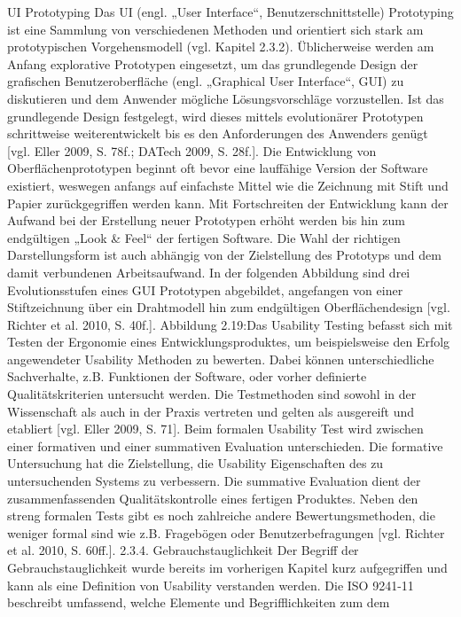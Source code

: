 \documentclass[a4paper, 12pt, twoside, BCOR=20mm, DIV=calc, abstracton, parskip=half*, toc=bibliography, toc=listof, headsepline, footsepline, headings=small, numbers=enddot]{scrreprt}
\begin{document}
UI Prototyping
Das UI (engl. „User Interface“, Benutzerschnittstelle) Prototyping ist eine Sammlung
von verschiedenen Methoden und orientiert sich stark am prototypischen Vorgehensmodell
(vgl. Kapitel 2.3.2). Üblicherweise werden am Anfang explorative Prototypen
eingesetzt, um das grundlegende Design der grafischen Benutzeroberfläche
(engl. „Graphical User Interface“, GUI) zu diskutieren und dem Anwender mögliche
Lösungsvorschläge vorzustellen. Ist das grundlegende Design festgelegt, wird dieses
mittels evolutionärer Prototypen schrittweise weiterentwickelt bis es den Anforderungen
des Anwenders genügt [vgl. Eller 2009, S. 78f.; DATech 2009, S. 28f.]. Die Entwicklung
von Oberflächenprototypen beginnt oft bevor eine lauffähige Version der
Software existiert, weswegen anfangs auf einfachste Mittel wie die Zeichnung mit
Stift und Papier zurückgegriffen werden kann. Mit Fortschreiten der Entwicklung kann
der Aufwand bei der Erstellung neuer Prototypen erhöht werden bis hin zum endgültigen
„Look & Feel“ der fertigen Software. Die Wahl der richtigen Darstellungsform ist
auch abhängig von der Zielstellung des Prototyps und dem damit verbundenen Arbeitsaufwand.
In der folgenden Abbildung sind drei Evolutionsstufen eines GUI Prototypen
abgebildet, angefangen von einer Stiftzeichnung über ein Drahtmodell hin
zum endgültigen Oberflächendesign [vgl. Richter et al. 2010, S. 40f.].
Abbildung 2.19:Das Usability Testing befasst sich mit Testen der Ergonomie eines Entwicklungsproduktes,
um beispielsweise den Erfolg angewendeter Usability Methoden zu bewerten.
Dabei können unterschiedliche Sachverhalte, z.B. Funktionen der Software, oder
vorher definierte Qualitätskriterien untersucht werden. Die Testmethoden sind sowohl
in der Wissenschaft als auch in der Praxis vertreten und gelten als ausgereift und
etabliert [vgl. Eller 2009, S. 71]. Beim formalen Usability Test wird zwischen einer
formativen und einer summativen Evaluation unterschieden. Die formative Untersuchung
hat die Zielstellung, die Usability Eigenschaften des zu untersuchenden Systems
zu verbessern. Die summative Evaluation dient der zusammenfassenden Qualitätskontrolle
eines fertigen Produktes. Neben den streng formalen Tests gibt es noch
zahlreiche andere Bewertungsmethoden, die weniger formal sind wie z.B. Fragebögen
oder Benutzerbefragungen [vgl. Richter et al. 2010, S. 60ff.].		
2.3.4. Gebrauchstauglichkeit
Der Begriff der Gebrauchstauglichkeit wurde bereits im vorherigen Kapitel kurz aufgegriffen
und kann als eine Definition von Usability verstanden werden. Die ISO
9241-11 beschreibt umfassend, welche Elemente und Begrifflichkeiten zum dem
\end{document}
